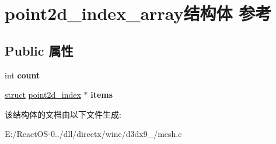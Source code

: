 \hypertarget{structpoint2d__index__array}{}\section{point2d\+\_\+index\+\_\+array结构体 参考}
\label{structpoint2d__index__array}
\subsection*{Public 属性}
\begin{DoxyCompactItemize}
\item 
\mbox{\label{structpoint2d__index__array_a9afb7f3d06399a63294076157dde2700}} 
int {\bfseries count}
\item 
\mbox{\label{structpoint2d__index__array_a9161bac6ccfb1884206163e81e474bb0}} 
\hyperlink{interfacestruct}{struct} \hyperlink{structpoint2d__index}{point2d\+\_\+index} $\ast$ {\bfseries items}
\end{DoxyCompactItemize}


该结构体的文档由以下文件生成\+:\begin{DoxyCompactItemize}
\item 
E\+:/\+React\+O\+S-\/0../dll/directx/wine/d3dx9\+\_/mesh.\+c\end{DoxyCompactItemize}
